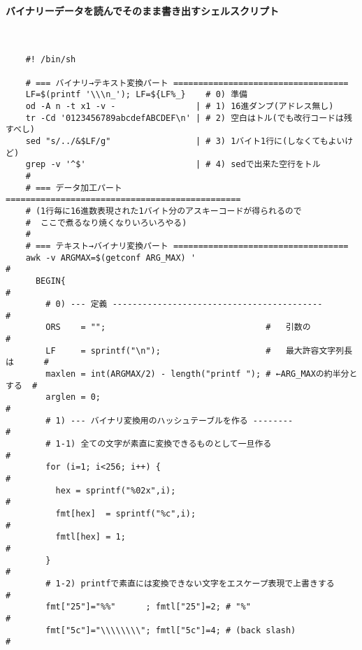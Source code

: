 \paragraph{バイナリーデータを読んでそのまま書き出すシェルスクリプト} 　\\
\begin{frameboxit}{160.0mm}
\begin{verbatim}
	#! /bin/sh

	# === バイナリ→テキスト変換パート ===================================
	LF=$(printf '\\\n_'); LF=${LF%_}    # 0) 準備
	od -A n -t x1 -v -                | # 1) 16進ダンプ(アドレス無し)
	tr -Cd '0123456789abcdefABCDEF\n' | # 2) 空白はトル(でも改行コードは残すべし)
	sed "s/../&$LF/g"                 | # 3) 1バイト1行に(しなくてもよいけど)
	grep -v '^$'                      | # 4) sedで出来た空行をトル
	#
	# === データ加工パート ===============================================
	# (1行毎に16進数表現された1バイト分のアスキーコードが得られるので
	#  ここで煮るなり焼くなりいろいろやる)
	#
	# === テキスト→バイナリ変換パート ===================================
	awk -v ARGMAX=$(getconf ARG_MAX) '                                        #
	  BEGIN{                                                                  #
	    # 0) --- 定義 ------------------------------------------              #
	    ORS    = "";                                #   引数の                 #
	    LF     = sprintf("\n");                     #   最大許容文字列長は      #
	    maxlen = int(ARGMAX/2) - length("printf "); # ←ARG_MAXの約半分とする  #
	    arglen = 0;                                                           #
	    # 1) --- バイナリ変換用のハッシュテーブルを作る --------                   #
	    # 1-1) 全ての文字が素直に変換できるものとして一旦作る                       #
	    for (i=1; i<256; i++) {                                               #
	      hex = sprintf("%02x",i);                                            #
	      fmt[hex]  = sprintf("%c",i);                                        #
	      fmtl[hex] = 1;                                                      #
	    }                                                                     #
	    # 1-2) printfで素直には変換できない文字をエスケープ表現で上書きする         #
	    fmt["25"]="%%"      ; fmtl["25"]=2; # "%"                             #
	    fmt["5c"]="\\\\\\\\"; fmtl["5c"]=4; # (back slash)                    #

\end{verbatim}
\end{frameboxit}
